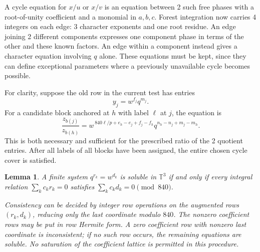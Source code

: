 \documentclass[11pt,a4paper]{article}
\newtheorem{lemma}[theorem]{Lemma}
\theoremstyle{plain}
\theoremstyle{definition}
\theoremstyle{plain}
\begin{document}
A cycle equation for $x/u$ or $x/v$ is an equation between 2 such free phases with a root-of-unity coefficient and a monomial in $a,b,c$. Forest integration now carries 4 integers on each edge: 3 character exponents and one root residue. An edge joining 2 different components expresses one component phase in terms of the other and these known factors. An edge within a component instead gives a character equation involving $q$ alone. These equations must be kept, since they can define exceptional parameters where a previously unavailable cycle becomes possible.

For clarity, suppose the old row in the current test has entries
$$y_j=w^{f_j}q^{m_j}.$$
For a candidate block anchored at $h$ with label $\ell$ at $j$, the equation is
\[
\frac{z_{b(j)}}{z_{b(h)}}=
w^{\,840\ell/p+e_h-e_j+f_j-f_h}
q^{n_h-n_j+m_j-m_h}.
\]
This is both necessary and sufficient for the prescribed ratio of the 2 quotient entries. After all labels of all blocks have been assigned, the entire chosen cycle cover is satisfied.

\par\addvspace{\medskipamount}\noindent
\begin{minipage}{\linewidth}
\begin{lemma}\label{n11_positive:integerconsistency}
A finite system $q^{r_k}=w^{d_k}$ is soluble in $\mathbb T^3$ if and only if every integral relation $\sum_k c_kr_k=0$ satisfies $\sum_k c_kd_k=0\pmod{840}$.

Consistency can be decided by integer row operations on the augmented rows $(r_k,d_k)$, reducing only the last coordinate modulo $840$. The nonzero coefficient rows may be put in row Hermite form. A zero coefficient row with nonzero last coordinate is inconsistent; if no such row occurs, the remaining equations are soluble. No saturation of the coefficient lattice is permitted in this procedure.
\end{lemma}
\end{minipage}
\par\addvspace{\medskipamount}
\end{document}
